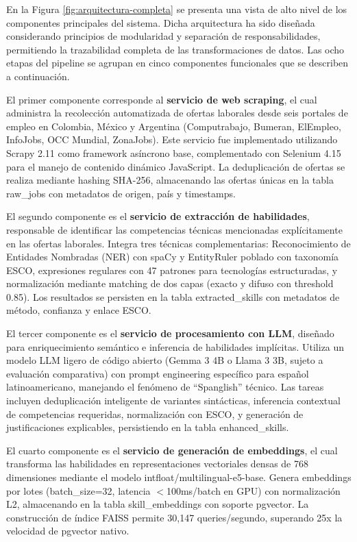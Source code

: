 En la Figura \ref{fig:arquitectura-completa} se presenta una vista de alto nivel de los componentes principales del sistema. Dicha arquitectura ha sido diseñada considerando principios de modularidad y separación de responsabilidades, permitiendo la trazabilidad completa de las transformaciones de datos. Las ocho etapas del pipeline se agrupan en cinco componentes funcionales que se describen a continuación.

El primer componente corresponde al \textbf{servicio de web scraping}, el cual administra la recolección automatizada de ofertas laborales desde seis portales de empleo en Colombia, México y Argentina (Computrabajo, Bumeran, ElEmpleo, InfoJobs, OCC Mundial, ZonaJobs). Este servicio fue implementado utilizando Scrapy 2.11 como framework asíncrono base, complementado con Selenium 4.15 para el manejo de contenido dinámico JavaScript. La deduplicación de ofertas se realiza mediante hashing SHA-256, almacenando las ofertas únicas en la tabla raw\_jobs con metadatos de origen, país y timestamps.

El segundo componente es el \textbf{servicio de extracción de habilidades}, responsable de identificar las competencias técnicas mencionadas explícitamente en las ofertas laborales. Integra tres técnicas complementarias: Reconocimiento de Entidades Nombradas (NER) con spaCy y EntityRuler poblado con taxonomía ESCO, expresiones regulares con 47 patrones para tecnologías estructuradas, y normalización mediante matching de dos capas (exacto y difuso con threshold 0.85). Los resultados se persisten en la tabla extracted\_skills con metadatos de método, confianza y enlace ESCO.

El tercer componente es el \textbf{servicio de procesamiento con LLM}, diseñado para enriquecimiento semántico e inferencia de habilidades implícitas. Utiliza un modelo LLM ligero de código abierto (Gemma 3 4B o Llama 3 3B, sujeto a evaluación comparativa) con prompt engineering específico para español latinoamericano, manejando el fenómeno de ``Spanglish'' técnico. Las tareas incluyen deduplicación inteligente de variantes sintácticas, inferencia contextual de competencias requeridas, normalización con ESCO, y generación de justificaciones explicables, persistiendo en la tabla enhanced\_skills.

El cuarto componente es el \textbf{servicio de generación de embeddings}, el cual transforma las habilidades en representaciones vectoriales densas de 768 dimensiones mediante el modelo intfloat/multilingual-e5-base. Genera embeddings por lotes (batch\_size=32, latencia $<$100ms/batch en GPU) con normalización L2, almacenando en la tabla skill\_embeddings con soporte pgvector. La construcción de índice FAISS permite 30,147 queries/segundo, superando 25x la velocidad de pgvector nativo.

